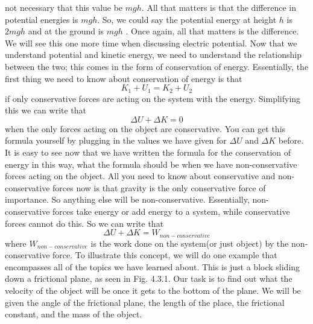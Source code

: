 not necessary that this value be $mgh$. All that matters is that the difference in potential energies is $mgh$. So, we could say the potential energy at height $h$ is $2mgh$ and at the ground is $mgh$ . Once again, all that matters is the difference. We will see this one more time when discussing electric potential. Now that we understand potential and kinetic energy, we need to understand the relationship between the two; this comes in the form of conservation of energy. Essentially, the first thing we need to know about conservation of energy is that \begin{equation}K_1+U_1=K_2+U_2\end{equation} if only conservative forces are acting on the system with the energy. Simplifying this we can write that $$\Delta U+\Delta K=0$$ when the only forces acting on the object are conservative. You can get this formula yourself by plugging in the values we have given for $\Delta U$ and $\Delta K$ before. It is easy to see now that we have written the formula for the conservation of energy in this way, what the formula should be when we have non-conservative forces acting on the object. All you need to know about conservative and non-conservative forces now is that gravity is the only conservative force of importance. So anything else will be non-conservative. Essentially, non-conservative forces take energy or add energy to a system, while conservative forces cannot do this. So we can write that \begin{equation}\Delta U+\Delta K=W_{non-conservative}\end{equation} where $W_{non-conservative}$ is the work done on the system(or just object) by the non-conservative force. To illustrate this concept, we will do one example that encompasses all of the topics we have learned about. This is just a block sliding down a frictional plane, as seen in Fig. 4.3.1. Our task is to find out what the velocity of the object will be once it gets to the bottom of the plane. We will be given the angle of the frictional plane, the length of the place, the frictional constant, and the mass of the object. 

